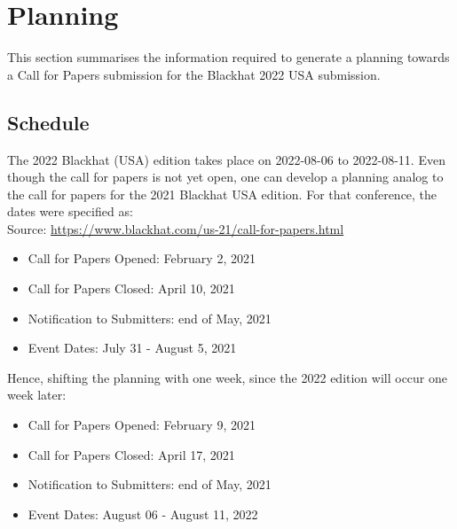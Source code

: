 \section{Planning}
\label{sec:planning}
This section summarises the information required to generate a planning towards a Call for Papers submission for the Blackhat 2022 USA submission.


\subsection{Schedule}
The 2022 Blackhat (USA) edition takes place on 2022-08-06 to 2022-08-11. Even though the call for papers is not yet open, one can develop a planning analog to the call for papers for the 2021 Blackhat USA edition. For that conference, the dates were specified as:\\
Source: \url{https://www.blackhat.com/us-21/call-for-papers.html}
\begin{itemize}
	\item Call for Papers Opened: February 2, 2021
	\item Call for Papers Closed: April 10, 2021
	\item Notification to Submitters: end of May, 2021
	\item Event Dates: July 31 - August 5, 2021
\end{itemize}
Hence, shifting the planning with one week, since the 2022 edition will occur one week later:
\begin{itemize}
	\item Call for Papers Opened: February 9, 2021
	\item Call for Papers Closed: April 17, 2021
	\item Notification to Submitters: end of May, 2021
	\item Event Dates: August 06 - August 11, 2022
\end{itemize}

